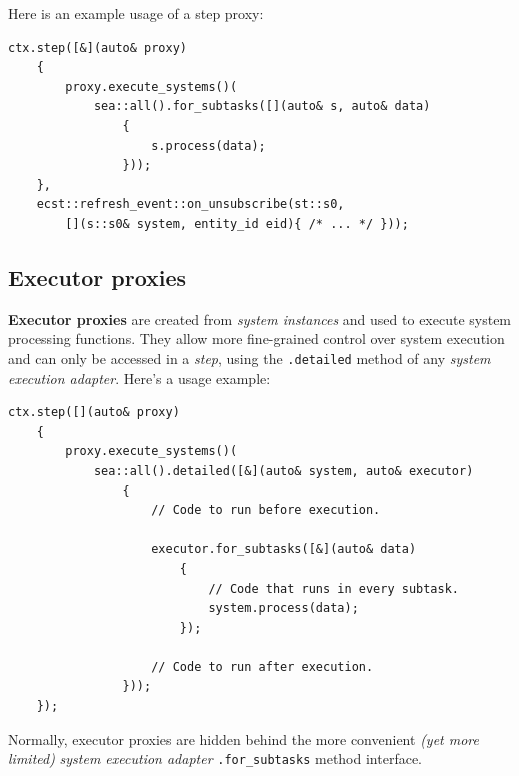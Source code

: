 \documentclass[twoside, 12pt, a4paper, openany]{book}
\begin{document}
Here is an example usage of a step proxy:

\begin{verbatim}
ctx.step([&](auto& proxy)
    {
        proxy.execute_systems()(
            sea::all().for_subtasks([](auto& s, auto& data)
                {
                    s.process(data);
                }));
    },
    ecst::refresh_event::on_unsubscribe(st::s0,
        [](s::s0& system, entity_id eid){ /* ... */ }));
\end{verbatim}

\subsection{Executor proxies}\label{executor-proxies}

\textbf{Executor proxies} are created from \emph{system instances} and
used to execute system processing functions. They allow more
fine-grained control over system execution and can only be accessed in a
\emph{step}, using the
\texttt{.detailed}
method of any \emph{system execution adapter}. Here's a usage example:

\begin{verbatim}
ctx.step([](auto& proxy)
    {
        proxy.execute_systems()(
            sea::all().detailed([&](auto& system, auto& executor)
                {
                    // Code to run before execution.

                    executor.for_subtasks([&](auto& data)
                        {
                            // Code that runs in every subtask.
                            system.process(data);
                        });

                    // Code to run after execution.
                }));
    });
\end{verbatim}

Normally, executor proxies are hidden behind the more convenient
\emph{(yet more limited)} \emph{system execution adapter}
\texttt{.for_subtasks}
method interface.
\end{document}
